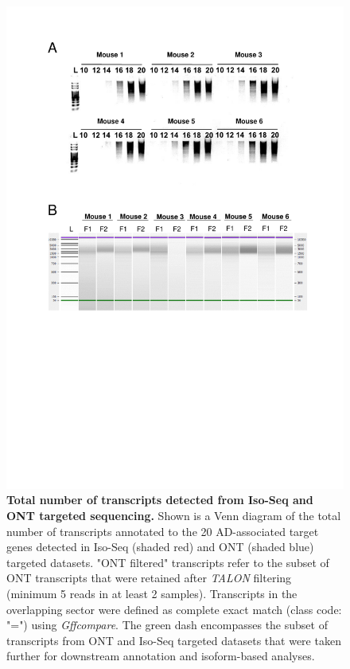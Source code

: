 \vspace{2cm}
\begin{figure}[htp]
	\centering
	\vspace{20pt}
	\includegraphics[page=4,trim={0 4cm 0 14cm},clip,scale = 0.75]{Figures/TargetedTranscriptome_LabResults.pdf}
	\captionsetup{width=0.95\textwidth}
	\caption[Finalised output from Iso-Seq and ONT targeted profiling of the rTg4510 cortex]%
	{\textbf{Total number of transcripts detected from Iso-Seq and ONT targeted sequencing.} Shown is a Venn diagram of the total number of transcripts annotated to the 20 AD-associated target genes detected in Iso-Seq (shaded red) and ONT (shaded blue) targeted datasets. "ONT filtered" transcripts refer to the subset of ONT transcripts that were retained after \textit{TALON} filtering (minimum 5 reads in at least 2 samples). Transcripts in the overlapping sector were defined as complete exact match (class code: "=") using \textit{Gffcompare}. The green dash encompasses the subset of transcripts from ONT and Iso-Seq targeted datasets that were taken further for downstream annotation and isoform-based analyses.}
	\label{fig:ont_isoseq_venn}
\end{figure}

